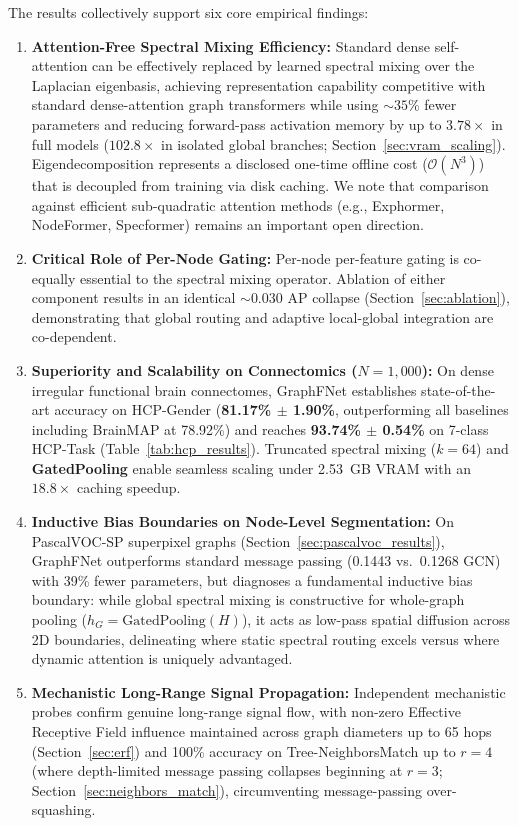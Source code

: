 \documentclass[10pt]{article}
\begin{document}
The results collectively support six core empirical findings:
\begin{enumerate}[leftmargin=2em]
    \item \textbf{Attention-Free Spectral Mixing Efficiency:} Standard dense self-attention can be effectively replaced by learned spectral mixing over the Laplacian eigenbasis, achieving representation capability competitive with standard dense-attention graph transformers while using ${\sim}35$\% fewer parameters and reducing forward-pass activation memory by up to $3.78\times$ in full models ($102.8\times$ in isolated global branches; Section~\ref{sec:vram_scaling}). Eigendecomposition represents a disclosed one-time offline cost ($\mathcal{O}(N^3)$) that is decoupled from training via disk caching. We note that comparison against efficient sub-quadratic attention methods (e.g., Exphormer, NodeFormer, Specformer) remains an important open direction.
    \item \textbf{Critical Role of Per-Node Gating:} Per-node per-feature gating is co-equally essential to the spectral mixing operator. Ablation of either component results in an identical ${\sim}0.030$ AP collapse (Section~\ref{sec:ablation}), demonstrating that global routing and adaptive local-global integration are co-dependent.
    \item \textbf{Superiority and Scalability on Connectomics ($N=1,000$):} On dense irregular functional brain connectomes, GraphFNet establishes state-of-the-art accuracy on HCP-Gender (\textbf{81.17\% $\pm$ 1.90\%}, outperforming all baselines including BrainMAP at 78.92\%) and reaches \textbf{93.74\% $\pm$ 0.54\%} on 7-class HCP-Task (Table~\ref{tab:hcp_results}). Truncated spectral mixing ($k=64$) and \textbf{GatedPooling} enable seamless scaling under 2.53~GB VRAM with an $18.8\times$ caching speedup.
    \item \textbf{Inductive Bias Boundaries on Node-Level Segmentation:} On PascalVOC-SP superpixel graphs (Section~\ref{sec:pascalvoc_results}), GraphFNet outperforms standard message passing (0.1443 vs.\ 0.1268 GCN) with 39\% fewer parameters, but diagnoses a fundamental inductive bias boundary: while global spectral mixing is constructive for whole-graph pooling ($h_G = \text{GatedPooling}(H)$), it acts as low-pass spatial diffusion across 2D boundaries, delineating where static spectral routing excels versus where dynamic attention is uniquely advantaged.
    \item \textbf{Mechanistic Long-Range Signal Propagation:} Independent mechanistic probes confirm genuine long-range signal flow, with non-zero Effective Receptive Field influence maintained across graph diameters up to 65 hops (Section~\ref{sec:erf}) and 100\% accuracy on Tree-NeighborsMatch up to $r=4$ (where depth-limited message passing collapses beginning at $r=3$; Section~\ref{sec:neighbors_match}), circumventing message-passing over-squashing.

\end{enumerate}
\end{document}
